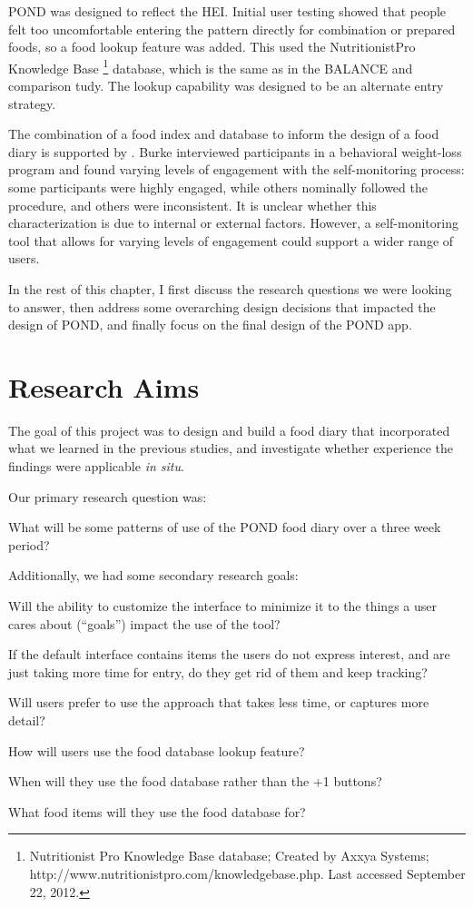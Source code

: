 POND was designed to reflect the HEI. Initial user testing showed that people felt too uncomfortable entering the pattern directly for combination or prepared foods, so a food lookup feature was added. This used the NutritionistPro Knowledge Base \footnote{Nutritionist Pro Knowledge Base database; Created by  Axxya Systems; http://www.nutritionistpro.com/knowledgebase.php. Last accessed September 22, 2012.} database, which is the same as in the BALANCE and comparison tudy. The lookup capability was designed to be an alternate entry strategy. 

The combination of a food index and database to inform the design of a food diary is supported by \citep{burke_experiences_2009}. Burke interviewed participants in a behavioral weight-loss program and found varying levels of engagement with the self-monitoring process: some participants were highly engaged, while others nominally followed the procedure, and others were inconsistent. It is unclear whether this characterization is due to internal or external factors. However, a self-monitoring tool that allows for varying levels of engagement could support a wider range of users. 


In the rest of this chapter, I first discuss the research questions we were looking to answer, then address some overarching design decisions that impacted the design of POND, and finally focus on the final design of the POND app. 

\section{Research Aims}
The goal of this project was to design and build a food diary that incorporated what we learned in the previous studies, and investigate whether experience the findings were applicable \textit{in situ}. 

Our primary research question was: 

What will be some patterns of use of the POND food diary over a three week period? 

Additionally, we had some secondary research goals: 

\begin{itemize*}
\item Will the ability to customize the interface to minimize it to the things a user cares about (``goals'') impact the use of the tool? 
\item If the default interface contains items the users do not express interest, and are just taking more time for entry, do they get rid of them and keep tracking? 
\item Will users prefer to use the approach that takes less time, or captures more detail?  
\item How will users use the food database lookup feature? 
\item\begin{itemize*}
\item When will they use the food database rather than the +1 buttons?
\item What food items will they use the food database for? 
\end{itemize*}
\end{itemize*}

